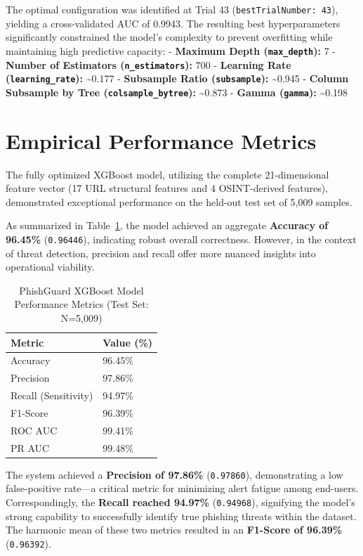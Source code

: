 The optimal configuration was identified at Trial 43
(\texttt{bestTrialNumber:\ 43}), yielding a cross-validated AUC of
0.9943. The resulting best hyperparameters significantly constrained the
model's complexity to prevent overfitting while maintaining high
predictive capacity: - \textbf{Maximum Depth (\texttt{max\_depth}):} 7 -
\textbf{Number of Estimators (\texttt{n\_estimators}):} 700 -
\textbf{Learning Rate (\texttt{learning\_rate}):} \textasciitilde0.177 -
\textbf{Subsample Ratio (\texttt{subsample}):} \textasciitilde0.945 -
\textbf{Column Subsample by Tree (\texttt{colsample\_bytree}):}
\textasciitilde0.873 - \textbf{Gamma (\texttt{gamma}):}
\textasciitilde0.198

\section{Empirical Performance
Metrics}\label{empirical-performance-metrics}

The fully optimized XGBoost model, utilizing the complete 21-dimensional
feature vector (17 URL structural features and 4 OSINT-derived
features), demonstrated exceptional performance on the held-out test set
of 5,009 samples. 

As summarized in Table~\ref{tab:performance_metrics}, the model achieved an aggregate \textbf{Accuracy of 96.45\%}
(\texttt{0.96446}), indicating robust overall correctness. However, in
the context of threat detection, precision and recall offer more nuanced
insights into operational viability.

\begin{table}[htbp]
\centering
\caption{PhishGuard XGBoost Model Performance Metrics (Test Set: N=5,009)}
\label{tab:performance_metrics}
\renewcommand{\arraystretch}{1.3}
\begin{tabular}{@{}ll@{}}
\toprule
\textbf{Metric} & \textbf{Value (\%)} \\
\midrule
Accuracy & 96.45\% \\
Precision & 97.86\% \\
Recall (Sensitivity) & 94.97\% \\
F1-Score & 96.39\% \\
ROC AUC & 99.41\% \\
PR AUC & 99.48\% \\
\bottomrule
\end{tabular}
\end{table}

The system achieved a \textbf{Precision of 97.86\%} (\texttt{0.97860}),
demonstrating a low false-positive rate---a critical metric for
minimizing alert fatigue among end-users. Correspondingly, the
\textbf{Recall reached 94.97\%} (\texttt{0.94968}), signifying the
model's strong capability to successfully identify true phishing threats
within the dataset. The harmonic mean of these two metrics resulted in
an \textbf{F1-Score of 96.39\%} (\texttt{0.96392}).

